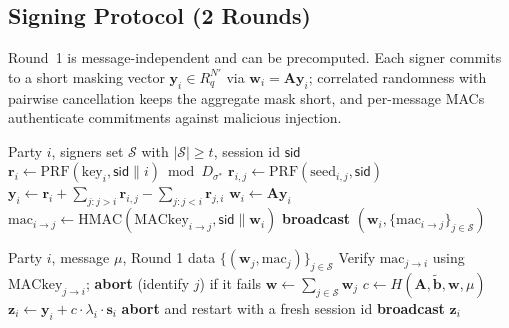 \subsection{Signing Protocol (2 Rounds)}

Round~1 is message-independent and can be precomputed. Each signer commits to a short
masking vector $\mathbf{y}_i \in R_q^{N'}$ via $\mathbf{w}_i = \mathbf{A}\mathbf{y}_i$;
correlated randomness with pairwise cancellation keeps the aggregate mask short, and
per-message MACs authenticate commitments against malicious injection.

\begin{algorithm}[H]
\caption{Corona Signing --- Round 1 (Message-Independent)}
\label{alg:sign-r1}
\begin{algorithmic}[1]
\Require Party $i$, signers set $\mathcal{S}$ with $|\mathcal{S}| \geq t$, session id $\mathsf{sid}$
\State $\mathbf{r}_i \gets \text{PRF}(\text{key}_i, \mathsf{sid} \| i) \bmod D_{\sigma^*}$ 
    \State $\mathbf{r}_{i,j} \gets \text{PRF}(\text{seed}_{i,j}, \mathsf{sid})$ 
\EndFor
\State $\mathbf{y}_i \gets \mathbf{r}_i + \sum_{j : j > i} \mathbf{r}_{i,j} - \sum_{j : j < i} \mathbf{r}_{j,i}$ 
\State $\mathbf{w}_i \gets \mathbf{A}\mathbf{y}_i$ 
    \State $\text{mac}_{i \to j} \gets \text{HMAC}(\text{MACkey}_{i \to j}, \mathsf{sid} \| \mathbf{w}_i)$
\EndFor
\State \textbf{broadcast} $(\mathbf{w}_i, \{\text{mac}_{i \to j}\}_{j \in \mathcal{S}})$
\end{algorithmic}
\end{algorithm}

\begin{algorithm}[H]
\caption{Corona Signing --- Round 2 (Message-Dependent)}
\label{alg:sign-r2}
\begin{algorithmic}[1]
\Require Party $i$, message $\mu$, Round 1 data $\{(\mathbf{w}_j, \text{mac}_j)\}_{j \in \mathcal{S}}$
    \State Verify $\text{mac}_{j \to i}$ using $\text{MACkey}_{j \to i}$; \textbf{abort} (identify $j$) if it fails
\EndFor
\State $\mathbf{w} \gets \sum_{j \in \mathcal{S}} \mathbf{w}_j$ 
\State $c \gets H(\mathbf{A}, \tilde{\mathbf{b}}, \mathbf{w}, \mu)$ 
\State $\mathbf{z}_i \gets \mathbf{y}_i + c \cdot \lambda_i \cdot \mathbf{s}_i$ 
 
    \State \textbf{abort} and restart with a fresh session id
\EndIf
\State \textbf{broadcast} $\mathbf{z}_i$
\end{algorithmic}
\end{algorithm}

